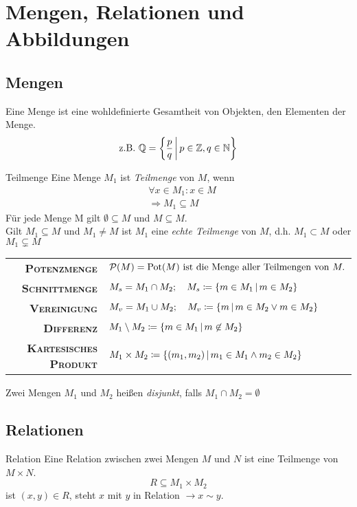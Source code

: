 \chapter{Mengen, Relationen und Abbildungen}

\section{Mengen}
Eine Menge ist eine wohldefinierte Gesamtheit von Objekten, den Elementen der Menge.
\begin{equation*}
  \text{z.B. }\mathbb{Q}=\left\{ \frac{p}{q} \,\middle|\, p\in\mathbb{Z}, q\in\mathbb{N} \right\}
\end{equation*}

\begin{definition}{Teilmenge}
	Eine Menge $M_1$ ist \emph{Teilmenge} von $M$, wenn
	\begin{align*}
	  &\forall x\in M_1 : x\in M\\
	  &\Rightarrow M_1 \subseteq M
	\end{align*}
	Für jede Menge M gilt $\emptyset \subseteq M$ und $M\subseteq M$.\\
	Gilt $M_1\subseteq M$ und $M_1\neq M$ ist $M_1$ eine \emph{echte Teilmenge} von $M$, d.h. $M_1 \subset M$ oder $M_1\subsetneq M$
\end{definition}

\renewcommand{\arraystretch}{1.4}
\begin{tabular}{>{\bfseries\scshape}r l}
	Potenzmenge & $\mathcal{P}(M)=\operatorname{Pot}(M) \text{ ist die Menge aller Teilmengen von } M.$\\
	Schnittmenge & $M_s = M_1 \cap M_2; \quad M_s \coloneqq \left\{ m\in M_1 \,\middle|\, m\in M_2 \right\}$\\
	Vereinigung & $M_v = M_1 \cup M_2; \quad M_v \coloneqq \left\{ m \,\middle|\, m\in M_2 \vee m\in M_2 \right\}$\\
	Differenz & $M_1\setminus M_2 \coloneqq \left\{ m\in M_1 \,\middle|\, m\not\in M_2 \right\}$\\
	Kartesisches Produkt & $M_1 \times M_2 \coloneqq \left\{ (m_1, m_2) \,\middle|\, m_1\in M_1 \wedge m_2\in M_2 \right\}$
\end{tabular}
\medskip

Zwei Mengen $M_1$ und $M_2$ heißen \emph{disjunkt}, falls $M_1\cap M_2 = \emptyset$

\section{Relationen}
\begin{definition}{Relation}
	Eine Relation zwischen zwei Mengen $M$ und $N$ ist eine Teilmenge von $M\times N$.
	\begin{equation*}
	  R\subseteq M_1\times M_2
	\end{equation*}
	ist $(x, y) \in R$, steht $x$ mit $y$ in Relation $\rightarrow x\sim y$.
\end{definition}

